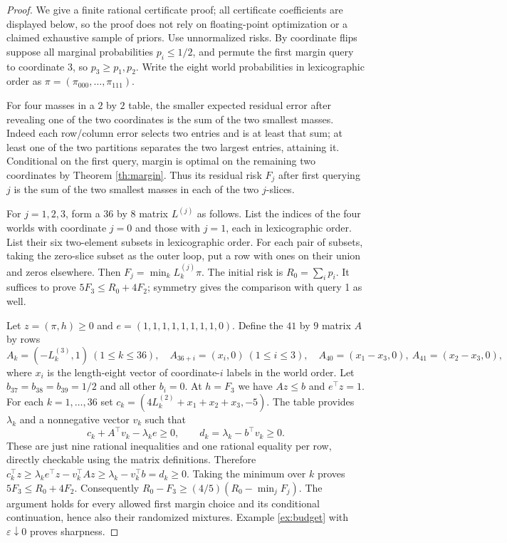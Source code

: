\documentclass[11pt]{article}
\theoremstyle{definition}
\newcommand{\1}{\mathbf 1}
\begin{document}
\begin{proof}
We give a finite rational certificate proof; all certificate coefficients
are displayed below, so the proof does not rely on floating-point
optimization or a claimed exhaustive sample of priors.
Use unnormalized risks. By coordinate flips suppose all marginal
probabilities $p_i\le1/2$, and permute the first margin query to coordinate
3, so $p_3\ge p_1,p_2$. Write the eight world probabilities in lexicographic
order as $\pi=(\pi_{000},\ldots,\pi_{111})$.

For four masses in a $2$ by $2$ table, the smaller expected residual error
after revealing one of the two coordinates is the sum of the two smallest
masses. Indeed each row/column error selects two entries and is at least
that sum; at least one of the two partitions separates the two largest
entries, attaining it. Conditional on the first query, margin is optimal
on the remaining two coordinates by Theorem \ref{th:margin}.
Thus its residual risk $F_j$ after first querying $j$ is the sum of the two
smallest masses in each of the two $j$-slices.

For $j=1,2,3$, form a $36$ by $8$ matrix $L^{(j)}$ as follows.
List the indices of the four worlds with coordinate $j=0$ and those with
$j=1$, each in lexicographic order. List their six two-element subsets in
lexicographic order. For each pair of subsets, taking the zero-slice subset
as the outer loop, put a row with ones on their union and zeros elsewhere.
Then $F_j=\min_k L^{(j)}_k\pi$.
The initial risk is $R_0=\sum_i p_i$.
It suffices to prove $5F_3\le R_0+4F_2$; symmetry gives the comparison with
query 1 as well.

Let $z=(\pi,h)\ge0$ and $e=(1,1,1,1,1,1,1,1,0)$.
Define the $41$ by $9$ matrix $A$ by rows
\[
 A_k=(-L^{(3)}_k,1)\ (1\le k\le36),\quad
 A_{36+i}=(x_i,0)\ (1\le i\le3),\quad
 A_{40}=(x_1-x_3,0),\ A_{41}=(x_2-x_3,0),
\]
where $x_i$ is the length-eight vector of coordinate-$i$ labels in the
world order. Let $b_{37}=b_{38}=b_{39}=1/2$ and all other $b_i=0$.
At $h=F_3$ we have $Az\le b$ and $e^\top z=1$.
For each $k=1,\ldots,36$ set
$c_k=(4L^{(2)}_k+x_1+x_2+x_3,-5)$.
The table provides $\lambda_k$ and a nonnegative vector $v_k$ such that
\[
 c_k+A^\top v_k-\lambda_ke\ge0,\qquad
 d_k=\lambda_k-b^\top v_k\ge0.
\]
These are just nine rational inequalities and one rational equality per row,
directly checkable using the matrix definitions.
Therefore
$c_k^\top z\ge\lambda_ke^\top z-v_k^\top Az
\ge\lambda_k-v_k^\top b=d_k\ge0$.
Taking the minimum over $k$ proves $5F_3\le R_0+4F_2$.
Consequently $R_0-F_3\ge(4/5)(R_0-\min_jF_j)$.
The argument holds for every allowed first margin choice and its conditional
continuation, hence also their randomized mixtures.
Example \ref{ex:budget} with $\varepsilon\downarrow0$ proves sharpness.
\end{proof}
\end{document}
